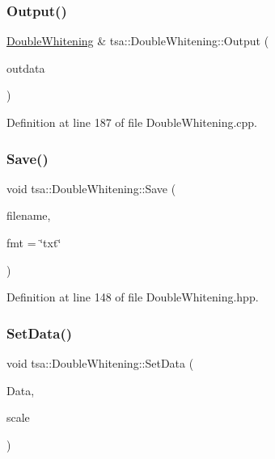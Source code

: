 \subsubsection{\texorpdfstring{Output()}{Output()}}
{\footnotesize\ttfamily \hyperlink{classtsa_1_1_double_whitening}{Double\+Whitening} \& tsa\+::\+Double\+Whitening\+::\+Output (\begin{DoxyParamCaption}\item[{\hyperlink{namespacetsa_ac599574bcc094eda25613724b8f3ca9e}{Seq\+View\+Double} \&}]{outdata }\end{DoxyParamCaption})}



Definition at line 187 of file Double\+Whitening.\+cpp.

\mbox{\label{classtsa_1_1_double_whitening_a1aa0f1d374957545ba734613f97fdfdb}} 
\subsubsection{\texorpdfstring{Save()}{Save()}}
{\footnotesize\ttfamily void tsa\+::\+Double\+Whitening\+::\+Save (\begin{DoxyParamCaption}\item[{const char $\ast$}]{filename,  }\item[{const char $\ast$}]{fmt = {\ttfamily \char`\"{}txt\char`\"{}} }\end{DoxyParamCaption})\hspace{0.3cm}{\ttfamily [inline]}}



Definition at line 148 of file Double\+Whitening.\+hpp.

\mbox{\label{classtsa_1_1_double_whitening_a0b4972ef97afa13544eb713749d891ae}} 
\subsubsection{\texorpdfstring{Set\+Data()}{SetData()}}
{\footnotesize\ttfamily void tsa\+::\+Double\+Whitening\+::\+Set\+Data (\begin{DoxyParamCaption}\item[{\hyperlink{namespacetsa_ad260cd21c1891c4ed391fe788569aba4}{Dmatrix} \&}]{Data,  }\item[{double}]{scale }\end{DoxyParamCaption})}




